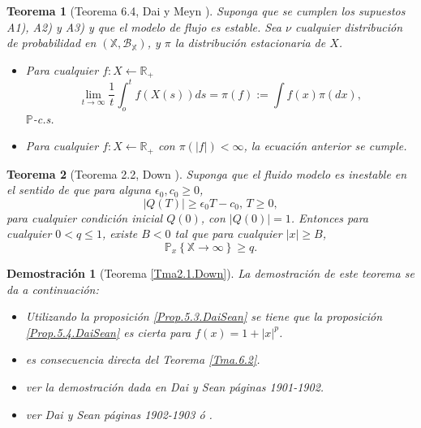 \documentclass{article}
\newtheorem{Teo}{Teorema}[section]
\newtheorem{Dem}{Demostraci\'on}[section]
\newcommand{\rea}{\mathbb{R}}
\newcommand{\prob}{\mathbb{P}}
\numberwithin{equation}{section}
\begin{document}
\begin{Teo}[Teorema 6.4, Dai y Meyn \cite{DaiSean}]\label{Tma.6.4.DaiSean}
Suponga que se cumplen los supuestos A1), A2) y A3) y que el
modelo de flujo es estable. Sea $\nu$ cualquier distribuci\'on de
probabilidad en
$\left(\mathbb{X},\mathcal{B}_{\mathbb{X}}\right)$, y $\pi$ la
distribuci\'on estacionaria de $X$.
\begin{itemize}
\item[i)] Para cualquier $f:X\leftarrow\rea_{+}$
\begin{equation}
\lim_{t\rightarrow\infty}\frac{1}{t}\int_{o}^{t}f\left(X\left(s\right)\right)ds=\pi\left(f\right):=\int
f\left(x\right)\pi\left(dx\right),
\end{equation}
$\prob$-c.s.

\item[ii)] Para cualquier $f:X\leftarrow\rea_{+}$ con
$\pi\left(|f|\right)<\infty$, la ecuaci\'on anterior se cumple.
\end{itemize}
\end{Teo}

\begin{Teo}[Teorema 2.2, Down \cite{Down}]\label{Tma2.2.Down}
Suponga que el fluido modelo es inestable en el sentido de que
para alguna $\epsilon_{0},c_{0}\geq0$,
\begin{equation}\label{Eq.Inestability}
|Q\left(T\right)|\geq\epsilon_{0}T-c_{0}\textrm{,   }T\geq0,
\end{equation}
para cualquier condici\'on inicial $Q\left(0\right)$, con
$|Q\left(0\right)|=1$. Entonces para cualquier $0<q\leq1$, existe
$B<0$ tal que para cualquier $|x|\geq B$,
\begin{equation}
\prob_{x}\left\{\mathbb{X}\rightarrow\infty\right\}\geq q.
\end{equation}
\end{Teo}

\begin{Dem}[Teorema \ref{Tma2.1.Down}] La demostraci\'on de este
teorema se da a continuaci\'on:\\
\begin{itemize}
\item[i)] Utilizando la proposici\'on \ref{Prop.5.3.DaiSean} se
tiene que la proposici\'on \ref{Prop.5.4.DaiSean} es cierta para
$f\left(x\right)=1+|x|^{p}$.

\item[i)] es consecuencia directa del Teorema \ref{Tma.6.2}.

\item[iii)] ver la demostraci\'on dada en Dai y Sean
\cite{DaiSean} p\'aginas 1901-1902.

\item[iv)] ver Dai y Sean \cite{DaiSean} p\'aginas 1902-1903 \'o
\cite{MeynTweedie2}.
\end{itemize}
\end{Dem}
\end{document}
